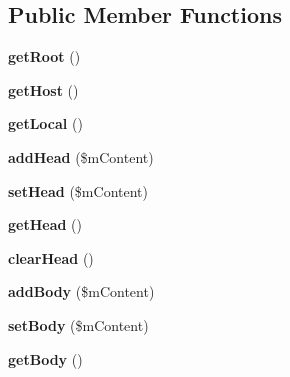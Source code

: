 \subsection*{Public Member Functions}
\begin{DoxyCompactItemize}
\item 
\hypertarget{class_html_model_aa20192f7fc62e117e35f5253c4600883}{{\bfseries get\-Root} ()}\label{class_html_model_aa20192f7fc62e117e35f5253c4600883}

\item 
\hypertarget{class_html_model_a032440cc1c0a17fcc4808c50d016ebd7}{{\bfseries get\-Host} ()}\label{class_html_model_a032440cc1c0a17fcc4808c50d016ebd7}

\item 
\hypertarget{class_html_model_a49df9cf3ca7ffb6ae42001bb311ee6c4}{{\bfseries get\-Local} ()}\label{class_html_model_a49df9cf3ca7ffb6ae42001bb311ee6c4}

\item 
\hypertarget{class_html_model_ac98a463094560995d956b285bc55c33f}{{\bfseries add\-Head} (\$m\-Content)}\label{class_html_model_ac98a463094560995d956b285bc55c33f}

\item 
\hypertarget{class_html_model_acaabc66e1bb726b1690bf3a3c3caa529}{{\bfseries set\-Head} (\$m\-Content)}\label{class_html_model_acaabc66e1bb726b1690bf3a3c3caa529}

\item 
\hypertarget{class_html_model_a48f29cb63825f1b6103e858898a89ac9}{{\bfseries get\-Head} ()}\label{class_html_model_a48f29cb63825f1b6103e858898a89ac9}

\item 
\hypertarget{class_html_model_aa37ec62aeb2275439584676231d87028}{{\bfseries clear\-Head} ()}\label{class_html_model_aa37ec62aeb2275439584676231d87028}

\item 
\hypertarget{class_html_model_acdcd30499cf43030b2110161b72518f0}{{\bfseries add\-Body} (\$m\-Content)}\label{class_html_model_acdcd30499cf43030b2110161b72518f0}

\item 
\hypertarget{class_html_model_a4a4f66785f6fae88c1d1aad081364132}{{\bfseries set\-Body} (\$m\-Content)}\label{class_html_model_a4a4f66785f6fae88c1d1aad081364132}

\item 
\hypertarget{class_html_model_ae2767d747d15a6396bb5a59480e2460b}{{\bfseries get\-Body} ()}\label{class_html_model_ae2767d747d15a6396bb5a59480e2460b}


\end{DoxyCompactItemize}
